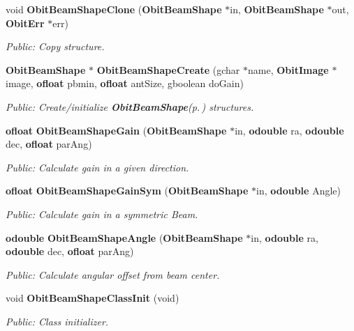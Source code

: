 \begin{CompactItemize}
void {\bf Obit\-Beam\-Shape\-Clone} ({\bf Obit\-Beam\-Shape} $\ast$in, {\bf Obit\-Beam\-Shape} $\ast$out, {\bf Obit\-Err} $\ast$err)
\begin{CompactList}\small\item\em Public: Copy structure. \item\end{CompactList}\item 
{\bf Obit\-Beam\-Shape} $\ast$ {\bf Obit\-Beam\-Shape\-Create} (gchar $\ast$name, {\bf Obit\-Image} $\ast$image, {\bf ofloat} pbmin, {\bf ofloat} ant\-Size, gboolean do\-Gain)
\begin{CompactList}\small\item\em Public: Create/initialize {\bf Obit\-Beam\-Shape}{\rm (p.\,\pageref{structObitBeamShape})} structures. \item\end{CompactList}\item 
{\bf ofloat} {\bf Obit\-Beam\-Shape\-Gain} ({\bf Obit\-Beam\-Shape} $\ast$in, {\bf odouble} ra, {\bf odouble} dec, {\bf ofloat} par\-Ang)
\begin{CompactList}\small\item\em Public: Calculate gain in a given direction. \item\end{CompactList}\item 
{\bf ofloat} {\bf Obit\-Beam\-Shape\-Gain\-Sym} ({\bf Obit\-Beam\-Shape} $\ast$in, {\bf odouble} Angle)
\begin{CompactList}\small\item\em Public: Calculate gain in a symmetric Beam. \item\end{CompactList}\item 
{\bf odouble} {\bf Obit\-Beam\-Shape\-Angle} ({\bf Obit\-Beam\-Shape} $\ast$in, {\bf odouble} ra, {\bf odouble} dec, {\bf ofloat} par\-Ang)
\begin{CompactList}\small\item\em Public: Calculate angular offset from beam center. \item\end{CompactList}\item 
void {\bf Obit\-Beam\-Shape\-Class\-Init} (void)
\begin{CompactList}\small\item\em Public: Class initializer. \item\end{CompactList}\end{CompactItemize}



